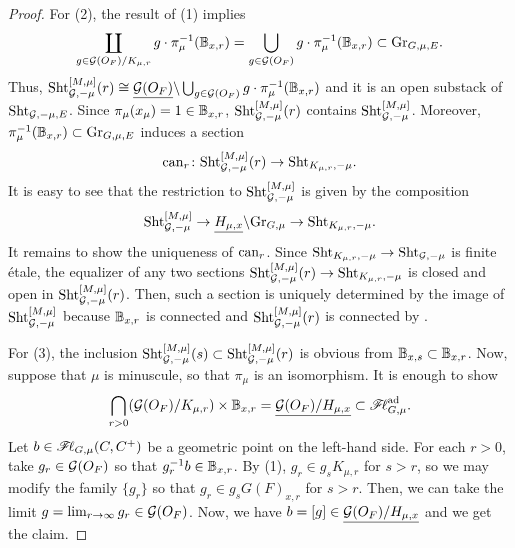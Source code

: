 \documentclass[12pt,reqno]{amsart}
\begin{document}
\begin{proof}
    For (2), the result of (1) implies
    \[
        \coprod_{g \in {\mathcal{G}}(O_F) / K_{\mu, r}} g \cdot \pi_\mu^{-1}(\mathbb{B}_{x, r}) = \bigcup_{g \in {\mathcal{G}}(O_F)} g \cdot \pi_\mu^{-1}(\mathbb{B}_{x, r}) \subset {\operatorname{Gr}}_{G, \mu, E}. 
    \]
    Thus, ${\operatorname{Sht}}_{{\mathcal{G}}, -\mu}^{[M, \mu]}(r) \cong {\underline{{\mathcal{G}}(O_F)}} \backslash \bigcup_{g \in {\mathcal{G}}(O_F)} g \cdot \pi_\mu^{-1}(\mathbb{B}_{x, r})$ and it is an open substack of ${\operatorname{Sht}}_{{\mathcal{G}}, -\mu, E}$. Since $\pi_\mu(x_\mu) = 1 \in \mathbb{B}_{x, r}$, ${\operatorname{Sht}}_{{\mathcal{G}}, -\mu}^{[M, \mu]}(r)$ contains ${\operatorname{Sht}}_{{\mathcal{G}}, -\mu}^{[M, \mu]}$. Moreover, $\pi_\mu^{-1}(\mathbb{B}_{x, r}) \subset {\operatorname{Gr}}_{G, \mu, E}$ induces a section
    \[
        {\operatorname{can}}_r \colon {\operatorname{Sht}}_{{\mathcal{G}}, -\mu}^{[M, \mu]}(r) \to {\operatorname{Sht}}_{K_{\mu, r}, -\mu}. 
    \]
    It is easy to see that the restriction to ${\operatorname{Sht}}_{{\mathcal{G}}, -\mu}^{[M, \mu]}$ is given by the composition
    \[
        {\operatorname{Sht}}_{{\mathcal{G}}, -\mu}^{[M, \mu]} \to {\underline{H_{\mu, x}}} \backslash {\operatorname{Gr}}_{G, \mu} \to {\operatorname{Sht}}_{K_{\mu, r}, -\mu}. 
    \]
    It remains to show the uniqueness of ${\operatorname{can}}_r$. Since ${\operatorname{Sht}}_{K_{\mu, r}, -\mu} \to {\operatorname{Sht}}_{{\mathcal{G}}, -\mu}$ is finite \'{e}tale, the equalizer of any two sections ${\operatorname{Sht}}_{{\mathcal{G}}, -\mu}^{[M, \mu]}(r) \to {\operatorname{Sht}}_{K_{\mu, r}, -\mu}$ is closed and open in ${\operatorname{Sht}}_{{\mathcal{G}}, -\mu}^{[M, \mu]}(r)$. Then, such a section is uniquely determined by the image of ${\operatorname{Sht}}_{{\mathcal{G}}, -\mu}^{[M, \mu]}$ because $\mathbb{B}_{x, r}$ is connected and ${\operatorname{Sht}}_{{\mathcal{G}}, -\mu}^{[M, \mu]}(r)$ is connected by . 

    For (3), the inclusion ${\operatorname{Sht}}_{{\mathcal{G}}, -\mu}^{[M, \mu]}(s) \subset {\operatorname{Sht}}_{{\mathcal{G}}, -\mu}^{[M, \mu]}(r)$ is obvious from $\mathbb{B}_{x, s} \subset \mathbb{B}_{x, r}$. Now, suppose that $\mu$ is minuscule, so that $\pi_\mu$ is an isomorphism. It is enough to show
    \[  
        \bigcap_{r > 0} ({\mathcal{G}}(O_F) / K_{\mu, r}) \times \mathbb{B}_{x, r} = {\underline{{\mathcal{G}}(O_F) / H_{\mu, x}}} \subset {\mathscr{F}\!\ell}_{G, \mu}^{\operatorname{ad}}. 
    \]
    Let $b \in {\mathscr{F}\!\ell}_{G, \mu}(C, C^+)$ be a geometric point on the left-hand side. For each $r > 0$, take $g_r \in {\mathcal{G}}(O_F)$ so that $g_r^{-1} b \in \mathbb{B}_{x, r}$. By (1), $g_r \in g_s K_{\mu, r}$ for $s > r$, so we may modify the family $\{g_r\}$ so that $g_r \in g_s G(F)_{x, r}$ for $s > r$. Then, we can take the limit $g = \lim_{r \to \infty} g_r \in {\mathcal{G}}(O_F)$. Now, we have $b = [g] \in {\underline{{\mathcal{G}}(O_F) / H_{\mu, x}}}$ and we get the claim. 
\end{proof}
\end{document}
